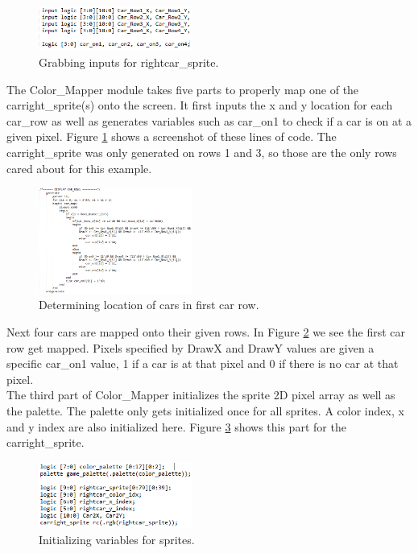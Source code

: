 \documentclass[journal, twocolumn, final,11pt,letterpaper]{IEEEtran}
\begin{document}
	\begin{figure}[H]
		\centering
		\includegraphics[width=0.45\textwidth]{sprite_description1.png}
		\caption{Grabbing inputs for rightcar\_sprite.}
		\label{fig:sprite_description1}
	\end{figure} 

The Color\_Mapper module takes five parts to properly map one of the carright\_sprite(s) onto the screen. It first inputs the x and y location for each car\_row as well as generates variables such as car\_on1 to check if a car is on at a given pixel. Figure \ref{fig:sprite_description1} shows a screenshot of these lines of code.  The carright\_sprite was only generated on rows 1 and 3, so those are the only rows cared about for this example.


	\begin{figure}[H]
		\centering
		\includegraphics[width=0.45\textwidth]{sprite_description2.png}
		\caption{Determining location of cars in first car row.}
		\label{fig:sprite_description2}
	\end{figure} 

Next four cars are mapped onto their given rows.  In Figure \ref{fig:sprite_description2} we see the first car row get mapped.  Pixels specified by DrawX and DrawY values are given a specific car\_on1 value, 1 if a car is at that pixel and 0 if there is no car at that pixel.  \\

The third part of Color\_Mapper initializes the sprite 2D pixel array as well as the palette.  The palette only gets initialized once for all sprites.  A color index, x and y index are also initialized here.  Figure \ref{fig:sprite_description3} shows this part for the carright\_sprite.            

 	\begin{figure}[H]
 		\centering
 		\includegraphics[width=0.45\textwidth]{sprite_description3.png}
 		\caption{Initializing variables for sprites.}
 		\label{fig:sprite_description3}
 	\end{figure} 
\end{document}
